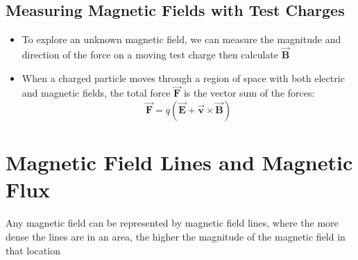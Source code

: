 \documentclass[11pt, a4paper]{article}
\begin{document}
\subsection{Measuring Magnetic Fields with Test Charges}
\begin{itemize}
    \item To explore an unknown magnetic field, we can measure the magnitude and
        direction of the force on a moving test charge then calculate $\vec{\mathbf{B}}$
    \item When a charged particle moves through a region of space with both electric and
        magnetic fields, the total force $\vec{\mathbf{F}}$ is the vector sum of the
        forces:
        \begin{equation}
            \vec{\mathbf{F}} = q(\vec{\mathbf{E}} + \vec{\mathbf{v}}
            \times \vec{\mathbf{B}})
        \end{equation}
\end{itemize}

\section[27.3, Magnetic Field Lines and Magnetic Flux]{Magnetic Field Lines and Magnetic Flux}
Any magnetic field can be represented by magnetic field lines, where the more
dense the lines are in an area, the higher the magnitude of the magnetic field in
that location
\end{document}
